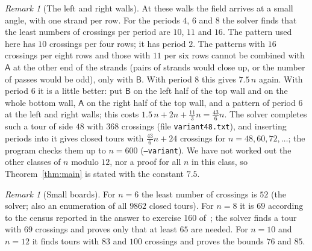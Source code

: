 \documentclass[11pt]{amsart}
\theoremstyle{remark}
\newtheorem{remark}[theorem]{Remark}
\begin{document}
\begin{remark}[The left and right walls]
At these walls the field arrives at a small angle, with one strand per row. For the periods $4$, $6$ and $8$ the
solver finds that the least numbers of crossings per period are $10$, $11$ and $16$. The pattern used here has $10$
crossings per four rows; it has period $2$. The patterns with $16$ crossings per eight rows and those with $11$
per six rows cannot be combined with $\mathsf A$ at the other end of the strands (pairs of strands would close up,
or the number of passes would be odd), only with $\mathsf B$. With period $8$ this gives $7.5\,n$ again. With
period $6$ it is a little better: put $\mathsf B$ on the left half of the top wall and on the whole bottom wall,
$\mathsf A$ on the right half of the top wall, and a pattern of period $6$ at the left and right walls; this costs
$1.5\,n+2n+\frac{11}{3}n=\frac{43}{6}n$. The solver completes such a tour of side $48$ with $368$ crossings (file
\texttt{variant48.txt}), and inserting periods into it gives closed tours with $\frac{43}{6}n+24$ crossings for
$n=48,60,72,\dots$; the program checks them up to $n=600$ (\texttt{--variant}). We have not worked out the other
classes of $n$ modulo $12$, nor a proof for all $n$ in this class, so Theorem~\ref{thm:main} is stated with the
constant $7.5$.
\end{remark}

\begin{remark}[Small boards]
For $n=6$ the least number of crossings is $52$ (the solver; also an enumeration of all $9862$ closed tours). For
$n=8$ it is $69$ according to the census reported in the answer to exercise 160 of~\cite{knuth}; the solver finds a
tour with $69$ crossings and proves only that at least $65$ are needed. For $n=10$ and $n=12$ it finds tours with
$83$ and $100$ crossings and proves the bounds $76$ and $85$.
\end{remark}
\end{document}

